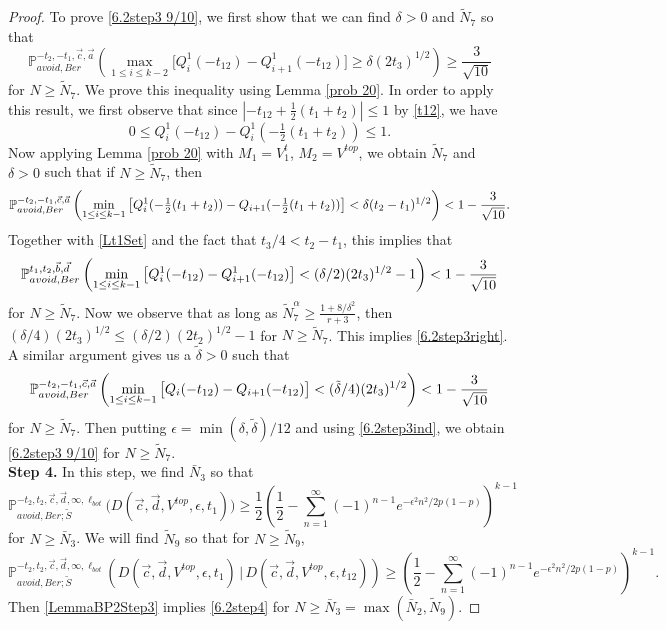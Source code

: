 \begin{proof}
	To prove \eqref{6.2step3 9/10}, we first show that we can find $\delta > 0$ and $\tilde{N}_7$ so that
	\begin{equation}\label{6.2step3right}
	\mathbb{P}^{-t_2,-t_1,\vec{c},\vec{a}}_{avoid, Ber}\left(\max_{1\leq i\leq k-2} \big[Q^1_i(-t_{12}) - Q^1_{i+1}(-t_{12})\big] \geq \delta(2t_3)^{1/2}\right) \geq \frac{3}{\sqrt{10}}
	\end{equation}
	for $N\geq\tilde{N}_7$. We prove this inequality using Lemma \ref{prob 20}. In order to apply this result, we first observe that since $|-t_{12}+\frac{1}{2}(t_1+t_2)| \leq 1$ by \eqref{t12}, we have
	\begin{equation}\label{Lt1Set}
	0 \leq Q^1_i(-t_{12})-Q^1_i(-\tfrac{1}{2}(t_1+t_2)) \leq 1.
	\end{equation}
	Now applying Lemma \ref{prob 20} with $M_1 = V_1^t$, $M_2 = V^{top}$, we obtain $\tilde{N}_7$ and $\delta>0$ such that if $N \geq \tilde{N}_7$, then
	\[
	\mathbb{P}^{-t_2,-t_1,\vec c, \vec a}_{avoid,Ber}\left(\min_{1\leq i\leq k-1} \big[Q^1_i(-\tfrac{1}{2}(t_1+t_2))-Q_{i+1}(-\tfrac{1}{2}(t_1+t_2))\big] < \delta(t_2-t_1)^{1/2}\right) < 1 - \frac{3}{\sqrt{10}}.
	\]
	Together with \eqref{Lt1Set} and the fact that $t_3/4 < t_2-t_1$, this implies that
	\begin{equation}\label{step3delta/2}
	\mathbb{P}^{t_1,t_2,\vec b, \vec d}_{avoid,Ber}\left(\min_{1\leq i\leq k-1} \big[Q_i^1(-t_{12})-Q_{i+1}^1(-t_{12})\big]<(\delta/2)(2t_3)^{1/2}-1\right) < 1 - \frac{3}{\sqrt{10}}
	\end{equation}
	for $N\geq \tilde{N}_7$. Now we observe that as long as $\tilde{N}_7^\alpha \geq \frac{1+8/\delta^2}{r+3}$, then $(\delta/4)(2t_3)^{1/2} \leq (\delta/2)(2t_2)^{1/2} - 1$ for $N\geq\tilde{N}_7$. This implies \eqref{6.2step3right}. A similar argument gives us a $\tilde{\delta}>0$ such that
	\[
	\mathbb{P}^{-t_2,-t_1,\vec c, \vec a}_{avoid,Ber}\left(\min_{1\leq i\leq k-1} \big[Q_i(-t_{12})-Q_{i+1}(-t_{12})\big]<(\tilde\delta/4)(2t_3)^{1/2}\right)<1 - \frac{3}{\sqrt{10}}
	\]
	for $N\geq\tilde{N}_7$. Then putting $\epsilon = \min(\delta,\tilde{\delta})/12$ and using \eqref{6.2step3ind}, we obtain \eqref{6.2step3 9/10} for $N\geq\tilde{N}_7$.\\
	
	{\bf \raggedleft Step 4.} In this step, we find $\bar{N}_3$ so that
	\begin{equation}\label{6.2step4}
	\mathbb{P}^{-t_2,t_2,\vec{c},\vec{d},\infty,\ell_{bot}}_{avoid,Ber;\tilde S}\big(D(\vec{c},\vec{d},V^{top},\epsilon,t_1) \big) \geq \frac{1}{2}\left(\frac{1}{2} - \sum_{n=1}^\infty (-1)^{n-1} e^{-\epsilon^2 n^2/2p(1-p)}\right)^{k-1}
	\end{equation}
	for $N\geq\bar{N}_3$. We will find $\tilde{N}_9$ so that for $N\geq\tilde{N}_9$,
	\begin{equation}\label{6.2step4sep}
	\mathbb{P}^{-t_2,t_2,\vec{c},\vec{d},\infty,\ell_{bot}}_{avoid,Ber;\tilde S}\left(D(\vec{c},\vec{d},V^{top},\epsilon,t_1) \,\big|\,D(\vec c, \vec d, V^{top}, \epsilon,t_{12})\right) \geq \left(\frac{1}{2} - \sum_{n=1}^\infty (-1)^{n-1} e^{-\epsilon^2 n^2/2p(1-p)}\right)^{k-1}.
	\end{equation}
	Then \eqref{LemmaBP2Step3} implies \eqref{6.2step4} for $N\geq\bar{N}_3 = \max(\bar{N}_2,\tilde{N}_9)$.
	

\end{proof}
